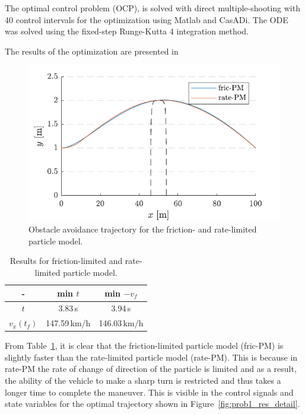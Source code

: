 The optimal control problem (OCP), is solved with direct multiple-shooting with 40 control intervals for the optimization using Matlab and CasADi. The ODE was solved using the fixed-step Runge-Kutta 4 integration method. 

The results of the optimization are presented in 

\begin{figure}[h!]
    \centering
    \includegraphics{figures/flp_avoid.pdf}
    \caption{Obstacle avoidance trajectory for the friction- and rate-limited particle model.}
    \label{fig:res_traj_p1}
\end{figure}

\pagebreak

\begin{table}[h]
    \centering
    \begin{tabular}{c|c|c}
        - & min $t$ & min $-v_f$ \\
        \hline
        $t$ & 3.83\,s & 3.94\,s \\
        $v_x(t_f)$ & 147.59\,km/h & 146.03\,km/h\\
    \end{tabular}
    \caption{Results for friction-limited and rate-limited particle model.}
    \label{tab:prob1_res}
\end{table}

From Table~\ref{tab:prob1_res}, it is clear that the friction-limited particle model (fric-PM) is slightly faster than the rate-limited particle model (rate-PM). 
This is because in rate-PM the rate of change of direction of the particle is limited and as a result, the ability of the vehicle to make a sharp turn is restricted and thus takes a longer time to complete the maneuver. 
This is visible in the control signals and state variables for the optimal trajectory shown in Figure~\ref{fig:prob1_res_detail}. 

